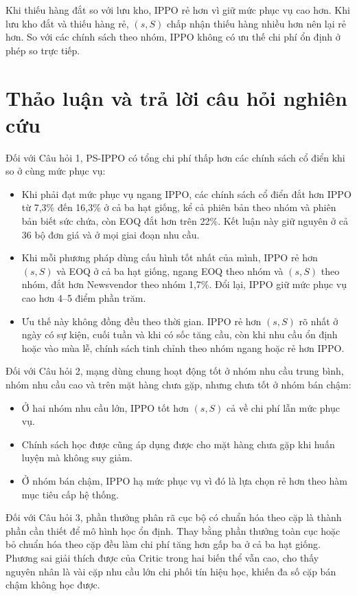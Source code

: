 Khi thiếu hàng đắt so với lưu kho, IPPO rẻ hơn vì giữ mức phục vụ cao hơn. Khi lưu kho đắt và thiếu hàng rẻ, $(s,S)$ chấp nhận thiếu hàng nhiều hơn nên lại rẻ hơn. So với các chính sách theo nhóm, IPPO không có ưu thế chi phí ổn định ở phép so trực tiếp.

\section{Thảo luận và trả lời câu hỏi nghiên cứu}
\label{sec:thaoLuan}

Đối với Câu hỏi 1, PS-IPPO có tổng chi phí thấp hơn các chính sách cổ điển khi so ở cùng mức phục vụ:
\begin{itemize}
    \item Khi phải đạt mức phục vụ ngang IPPO, các chính sách cổ điển đắt hơn IPPO từ 7,3\% đến 16,3\% ở cả ba hạt giống, kể cả phiên bản theo nhóm và phiên bản biết sức chứa, còn EOQ đắt hơn trên 22\%. Kết luận này giữ nguyên ở cả 36 bộ đơn giá và ở mọi giai đoạn nhu cầu.
    \item Khi mỗi phương pháp dùng cấu hình tốt nhất của mình, IPPO rẻ hơn $(s, S)$ và EOQ ở cả ba hạt giống, ngang EOQ theo nhóm và $(s, S)$ theo nhóm, đắt hơn Newsvendor theo nhóm 1,7\%. Đổi lại, IPPO giữ mức phục vụ cao hơn 4--5 điểm phần trăm.
    \item Ưu thế này không đồng đều theo thời gian. IPPO rẻ hơn $(s,S)$ rõ nhất ở ngày có sự kiện, cuối tuần và khi có sốc tăng cầu, còn khi nhu cầu ổn định hoặc vào mùa lễ, chính sách tinh chỉnh theo nhóm ngang hoặc rẻ hơn IPPO.
\end{itemize}

Đối với Câu hỏi 2, mạng dùng chung hoạt động tốt ở nhóm nhu cầu trung bình, nhóm nhu cầu cao và trên mặt hàng chưa gặp, nhưng chưa tốt ở nhóm bán chậm:
\begin{itemize}
    \item Ở hai nhóm nhu cầu lớn, IPPO tốt hơn $(s, S)$ cả về chi phí lẫn mức phục vụ.
    \item Chính sách học được cũng áp dụng được cho mặt hàng chưa gặp khi huấn luyện mà không suy giảm.
    \item Ở nhóm bán chậm, IPPO hạ mức phục vụ vì đó là lựa chọn rẻ hơn theo hàm mục tiêu cấp hệ thống.
\end{itemize}

Đối với Câu hỏi 3, phần thưởng phân rã cục bộ có chuẩn hóa theo cặp là thành phần cần thiết để mô hình học ổn định. Thay bằng phần thưởng toàn cục hoặc bỏ chuẩn hóa theo cặp đều làm chi phí tăng hơn gấp ba ở cả ba hạt giống. Phương sai giải thích được của Critic trong hai biến thể vẫn cao, cho thấy nguyên nhân là vài cặp nhu cầu lớn chi phối tín hiệu học, khiến đa số cặp bán chậm không học được.

